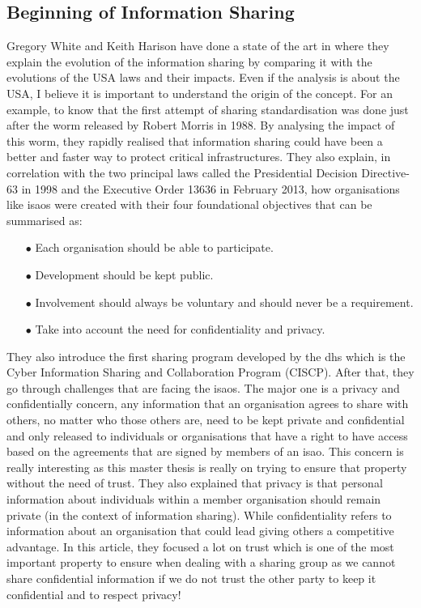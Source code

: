 \documentclass{eplmastersthesis}
\begin{document}
\subsection{Beginning of Information Sharing}
 Gregory White and Keith Harison have done a state of the art in \cite{white2017state} where they explain the evolution of the information sharing by comparing it with the evolutions of the USA laws and their impacts.
Even if the analysis is about the USA, I believe it is important to understand the origin of the concept. For an example, to know that the first attempt of sharing standardisation was done just after the worm released by Robert Morris in 1988.
By analysing the impact of this worm, they rapidly realised that information sharing could have been a better and faster way to protect critical infrastructures. They also explain, in correlation with the two principal laws called the Presidential Decision Directive-63 in 1998 and the Executive Order 13636 in February 2013, how organisations like \glspl{isao} were created with their four foundational objectives that can be summarised as:
\begin{itemize}
\item[$\bullet$] Each organisation should be able to participate.
\item[$\bullet$] Development should be kept public.
\item[$\bullet$] Involvement should always be voluntary and should never be a requirement.
\item[$\bullet$] Take into account the need for confidentiality and privacy.
\end{itemize}
They also introduce the first sharing program developed by the \gls{dhs} which is the Cyber Information Sharing and Collaboration Program (CISCP). After that, they go through challenges that are facing the \glspl{isao}. The major one is a privacy and confidentially concern, any information that an organisation agrees to share with others, no matter who those others are, need to be kept private and confidential and only released to individuals or organisations that have a right to have access based on the agreements that are signed by members of an \gls{isao}. This concern is really interesting as this master thesis is really on trying to ensure that property without the need of trust. They also explained that privacy is that personal information about individuals within a member organisation should remain private (in the context of information sharing).
While confidentiality refers to information about an organisation that could lead giving others a competitive advantage.
In this article, they focused a lot on trust which is one of the most important property to ensure when dealing with a sharing group as we cannot share confidential information if we do not trust the other party to keep it confidential and to respect privacy! \\
\end{document}
